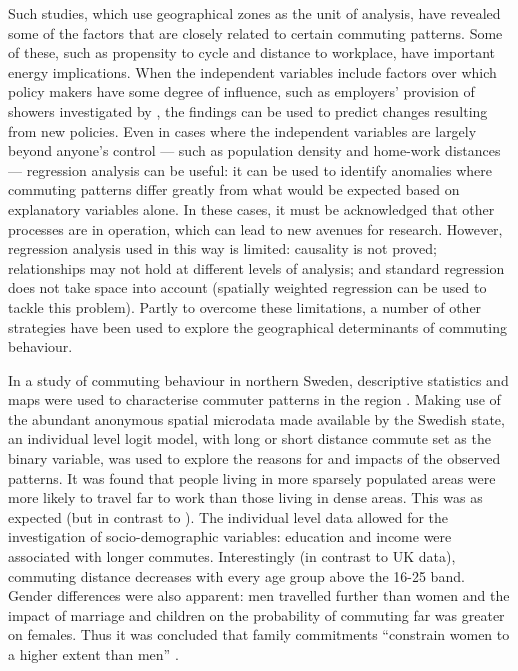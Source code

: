 Such studies, which use geographical zones as the unit of analysis,
have revealed some of the factors that are closely related to certain commuting
patterns. Some of these, such as propensity to cycle and distance to workplace,
have important energy implications. When the independent variables include
factors over which policy makers have some degree of influence, such as
employers' provision of showers investigated by \citet{Buehler2012}, the
findings can be used to predict changes resulting from new policies. Even in
cases where the independent variables are largely beyond anyone's control ---
such as population density and home-work distances ---
regression analysis can be useful: it can be used to identify anomalies
where commuting patterns differ greatly from what would be expected based on
explanatory variables alone. In these cases, it must be acknowledged that
other processes are in operation, which can lead to new avenues for research.
However, regression analysis used in this way is limited:
causality is not proved; relationships may not hold at different levels of
analysis; and standard regression does not take space into account
(spatially weighted regression can be used to tackle this problem).
Partly to overcome these limitations, a number of other strategies have
been used to explore the geographical determinants of commuting behaviour.

In a study of commuting behaviour in northern Sweden, descriptive statistics
and maps were used to characterise commuter patterns in the region \citep{Sandow2008}.
Making use of the abundant
anonymous spatial microdata made available by the Swedish state, an
individual level logit model, with long or short distance commute
set as the binary variable,
was used to explore the reasons for and impacts of the observed patterns.
It was found that people living in more sparsely populated areas
were more likely to travel far to work than those living in dense areas.
This was as expected (but in contrast to \citet{Titheridge2006}).
The individual level data allowed for the investigation of socio-demographic
variables: education and income were associated with longer commutes.
Interestingly (in contrast to UK data), commuting distance decreases
with every age group above the 16-25 band. Gender differences were also
apparent: men travelled further than women and the impact of marriage and
children on the probability of commuting far was greater on females. Thus
it was concluded that family
commitments ``constrain women to a higher extent than men''
\citep[p.~24]{Sandow2008}.

